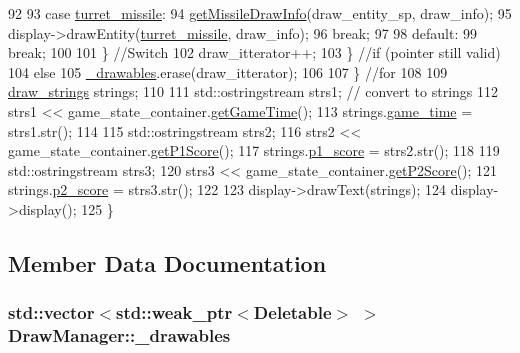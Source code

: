 \begin{DoxyCode}
92 
93                 \textcolor{keywordflow}{case} \hyperlink{Structures_8h_a6d8f83e710b27d4f86c45f0bb77066e3a8f552a1e495ced5aa8775faa1b6a757b}{turret\_missile}:
94                     \hyperlink{classDrawManager_ae85d0a7a0c8b6c2a3abb0a617d8599ea}{getMissileDrawInfo}(draw\_entity\_sp, draw\_info);
95                     display->drawEntity(\hyperlink{Structures_8h_a6d8f83e710b27d4f86c45f0bb77066e3a8f552a1e495ced5aa8775faa1b6a757b}{turret\_missile}, draw\_info);
96                     \textcolor{keywordflow}{break};
97 
98                 \textcolor{keywordflow}{default}:
99                 \textcolor{keywordflow}{break};
100 
101             \} \textcolor{comment}{//Switch}
102             draw\_itterator++;
103         \} \textcolor{comment}{//if (pointer still valid)}
104         \textcolor{keywordflow}{else}
105             \hyperlink{classDrawManager_a87982f3a0af2ece0a3a431a8f2fe4478}{\_drawables}.erase(draw\_itterator);
106 
107     \} \textcolor{comment}{//for}
108 
109     \hyperlink{structdraw__strings}{draw\_strings} strings;
110 
111     std::ostringstream strs1; \textcolor{comment}{// convert to strings}
112     strs1 << game\_state\_container.\hyperlink{classGameStateData_a0cb5cf167da9dd1929c719778c5d3506}{getGameTime}();
113     strings.\hyperlink{structdraw__strings_a4d19f66b000d19861c475694328d9fce}{game\_time} = strs1.str();
114 
115     std::ostringstream strs2;
116     strs2 << game\_state\_container.\hyperlink{classGameStateData_ac4dbf8f19eb4abae6c6e674e1f0ad473}{getP1Score}();
117     strings.\hyperlink{structdraw__strings_a0d59a0f9e78f1c539dbe7959dcd9c3bb}{p1\_score} = strs2.str();
118 
119     std::ostringstream strs3;
120     strs3 << game\_state\_container.\hyperlink{classGameStateData_a024affaa547433a0feca091d2bc516b6}{getP2Score}();
121     strings.\hyperlink{structdraw__strings_a749fa74ab7403f436f100c546b073be8}{p2\_score} = strs3.str();
122 
123     display->drawText(strings);
124     display->display();
125 \}
\end{DoxyCode}


\subsection{Member Data Documentation}
\hypertarget{classDrawManager_a87982f3a0af2ece0a3a431a8f2fe4478}{
\subsubsection[{\-\_\-drawables}]{\setlength{\rightskip}{0pt plus 5cm}std\-::vector$<$std\-::weak\-\_\-ptr$<${\bf Deletable}$>$ $>$ Draw\-Manager\-::\-\_\-drawables\hspace{0.3cm}{\ttfamily [private]}}}\label{classDrawManager_a87982f3a0af2ece0a3a431a8f2fe4478}


